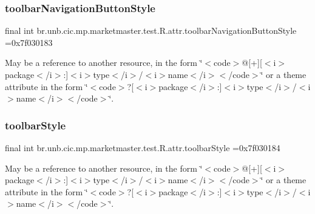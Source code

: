 \subsubsection{\texorpdfstring{toolbar\+Navigation\+Button\+Style}{toolbarNavigationButtonStyle}}
{\footnotesize\ttfamily final int br.\+unb.\+cic.\+mp.\+marketmaster.\+test.\+R.\+attr.\+toolbar\+Navigation\+Button\+Style =0x7f030183\hspace{0.3cm}{\ttfamily [static]}}

May be a reference to another resource, in the form \char`\"{}$<$code$>$@\mbox{[}+\mbox{]}\mbox{[}$<$i$>$package$<$/i$>$\+:\mbox{]}$<$i$>$type$<$/i$>$/$<$i$>$name$<$/i$>$$<$/code$>$\char`\"{} or a theme attribute in the form \char`\"{}$<$code$>$?\mbox{[}$<$i$>$package$<$/i$>$\+:\mbox{]}$<$i$>$type$<$/i$>$/$<$i$>$name$<$/i$>$$<$/code$>$\char`\"{}. \mbox{\label{classbr_1_1unb_1_1cic_1_1mp_1_1marketmaster_1_1test_1_1R_1_1attr_ac89abdd87f1b90e664a20e1fe534dbb2}} 
\subsubsection{\texorpdfstring{toolbar\+Style}{toolbarStyle}}
{\footnotesize\ttfamily final int br.\+unb.\+cic.\+mp.\+marketmaster.\+test.\+R.\+attr.\+toolbar\+Style =0x7f030184\hspace{0.3cm}{\ttfamily [static]}}

May be a reference to another resource, in the form \char`\"{}$<$code$>$@\mbox{[}+\mbox{]}\mbox{[}$<$i$>$package$<$/i$>$\+:\mbox{]}$<$i$>$type$<$/i$>$/$<$i$>$name$<$/i$>$$<$/code$>$\char`\"{} or a theme attribute in the form \char`\"{}$<$code$>$?\mbox{[}$<$i$>$package$<$/i$>$\+:\mbox{]}$<$i$>$type$<$/i$>$/$<$i$>$name$<$/i$>$$<$/code$>$\char`\"{}. \mbox{\label{classbr_1_1unb_1_1cic_1_1mp_1_1marketmaster_1_1test_1_1R_1_1attr_adc2775fa1059c08568527b3c5978bdf5}} 
